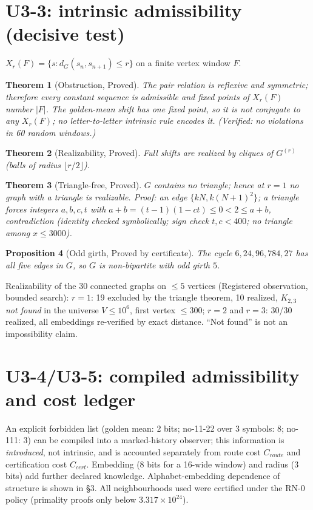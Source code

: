 \documentclass[11pt]{article}
\newtheorem{thm}{Theorem}\newtheorem{prop}[thm]{Proposition}\theoremstyle{definition}\newtheorem{defn}{Definition}
\begin{document}
\section{U3-3: intrinsic admissibility (decisive test)}
$X_r(F)=\{s: d_G(s_n,s_{n+1})\le r\}$ on a finite vertex window $F$.
\begin{thm}[Obstruction, Proved] The pair relation is reflexive and symmetric; therefore every constant sequence is admissible and fixed points of $X_r(F)$ number $|F|$. The golden-mean shift has one fixed point, so it is not conjugate to any $X_r(F)$; no letter-to-letter intrinsic rule encodes it. (Verified: no violations in 60 random windows.)\end{thm}
\begin{thm}[Realizability, Proved] Full shifts are realized by cliques of $G^{(r)}$ (balls of radius $\lfloor r/2\rfloor$).\end{thm}
\begin{thm}[Triangle-free, Proved] $G$ contains no triangle; hence at $r=1$ no graph with a triangle is realizable. Proof: an edge $\{kN,k(N+1)^2\}$; a triangle forces integers $a,b,c,t$ with $a+b=(t-1)(1-ct)\le0<2\le a+b$, contradiction (identity checked symbolically; sign check $t,c<400$; no triangle among $x\le3000$).\end{thm}
\begin{prop}[Odd girth, Proved by certificate] The cycle $6,24,96,784,27$ has all five edges in $G$, so $G$ is non-bipartite with odd girth $5$.\end{prop}
Realizability of the 30 connected graphs on $\le5$ vertices (Registered observation, bounded search): $r=1$: 19 excluded by the triangle theorem, 10 realized, $K_{2,3}$ \emph{not found} in the universe $V\le10^6$, first vertex $\le300$; $r=2$ and $r=3$: 30/30 realized, all embeddings re-verified by exact distance. ``Not found'' is not an impossibility claim.
\section{U3-4/U3-5: compiled admissibility and cost ledger}
An explicit forbidden list (golden mean: 2 bits; no-11-22 over 3 symbols: 8; no-111: 3) can be compiled into a marked-history observer; this information is \emph{introduced}, not intrinsic, and is accounted separately from route cost $C_{route}$ and certification cost $C_{cert}$. Embedding (8 bits for a 16-wide window) and radius (3 bits) add further declared knowledge. Alphabet-embedding dependence of structure is shown in \S3. All neighbourhoods used were certified under the RN-0 policy (primality proofs only below $3.317\times10^{24}$).
\end{document}
